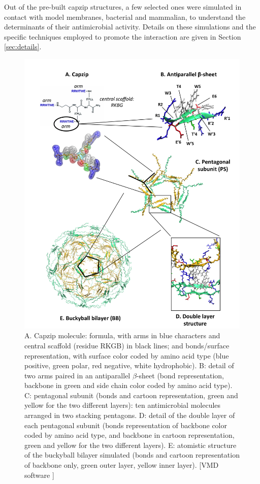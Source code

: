 Out of the pre-built capzip structures, a few selected ones were simulated in contact with model membranes, bacterial and mammalian, to understand the determinants of their antimicrobial activity. Details on these simulations and the specific techniques employed to promote the interaction are given in Section \ref{sec:details}.
%
\begin{figure}[p!]
\centering
	\includegraphics[width=0.95\linewidth]{3results_capsule/pics/img_build.png}
\caption[Building blocks of capzip assembly]{A. Capzip molecule: formula, with arms in blue characters and central scaffold (residue RKGB) in black lines; and bonds/surface representation, with surface color coded by amino acid type (blue positive, green polar, red negative, white hydrophobic).
%
B: detail of two arms paired in an antiparallel $\beta$-sheet (bond representation, backbone in green and side chain color coded by amino acid type).
%
C: pentagonal subunit (bonds and cartoon representation, green and yellow for the two different layers): ten antimicrobial molecules arranged in two stacking pentagons. 
%
D: detail of the double layer of each pentagonal subunit (bonds representation of backbone color coded by amino acid type, and backbone in cartoon representation, green and yellow for the two different layers).
%
E: atomistic structure of the buckyball bilayer simulated (bonds and cartoon representation of backbone only, green outer layer, yellow inner layer). [VMD software \citet{HUMP96}]}
\label{fig:BTI_vmd}
\end{figure}



